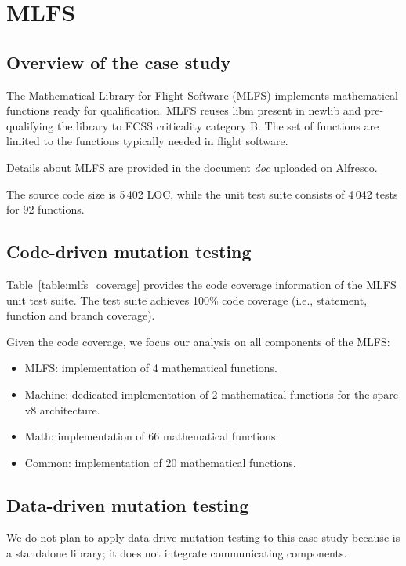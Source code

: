 \clearpage

\section{MLFS}
\label{sec:caseStudies:GSL:MLSF}

\subsection{Overview of the case study}

The Mathematical Library for Flight Software (MLFS) implements mathematical functions ready for qualification. MLFS reuses libm present in newlib and pre-qualifying the library to ECSS criticality category B. The set of functions are limited to the functions typically needed in flight software. 

Details about MLFS are provided in the document \emph{doc} uploaded on Alfresco.

The source code size is 5\,402 LOC, while the unit test suite consists of 4\,042 tests for 92 functions.

\subsection{Code-driven mutation testing}



Table~\ref{table:mlfs_coverage} provides the code coverage information of the MLFS unit test suite. The test suite achieves 100\% code coverage (i.e., statement, function and branch coverage).

Given the code coverage, we focus our analysis on all components of the MLFS:

\begin{itemize}
	\item MLFS: implementation of 4 mathematical functions.
	\item Machine: dedicated implementation of 2 mathematical functions for the sparc v8 architecture.
	\item Math: implementation of 66 mathematical functions.
	\item Common: implementation of 20 mathematical functions.
\end{itemize}

\subsection{Data-driven mutation testing}

We do not plan to apply data drive mutation testing to this case study because is a standalone library; it does not integrate communicating components.



